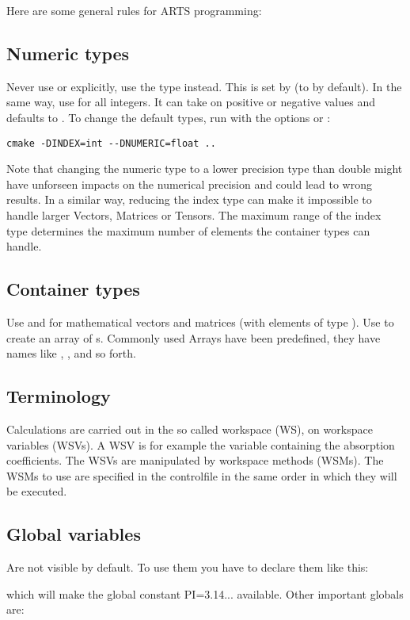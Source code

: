 Here are some general rules for ARTS programming:

\subsection{Numeric types} Never use  or
 explicitly, use the type  instead.
This is set by  (to  by default).
In the same way, use  for all integers. It can take on
positive or negative values and defaults to .
To change the default types, run  with the options
 or :

{\small
\begin{verbatim}
cmake -DINDEX=int --DNUMERIC=float ..
\end{verbatim}
}

Note that changing the numeric type to a lower precision type than
double might have unforseen impacts on the numerical precision and could
lead to wrong results. In a similar way, reducing the index type can
make it impossible to handle larger Vectors, Matrices or Tensors. The
maximum range of the index type determines the maximum number of
elements the container types can handle.

\subsection{Container types} Use  and
 for mathematical vectors and matrices (with elements
of type ). Use  to
create an array of s.
Commonly used Arrays have been predefined, they have names like
, , and so forth.

\subsection{Terminology}
Calculations are carried out in the so called workspace (WS), on
workspace variables (WSVs). A WSV is for example the variable
containing the absorption coefficients. The WSVs are manipulated by 
workspace methods (WSMs). The WSMs to use are specified in the
controlfile in the same order in which they will be
executed. 

\subsection{Global variables}
   Are not visible by default. To use them you have to declare them
   like this:
   \begin{quote}
   \end{quote}
   which will make the global constant PI=3.14... available. Other important globals are:

